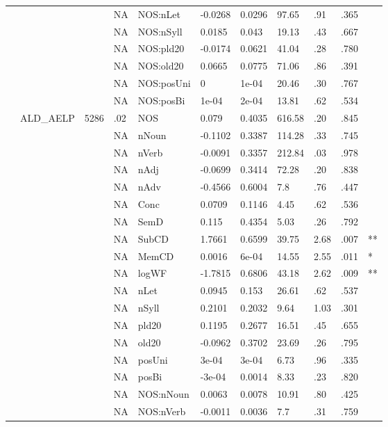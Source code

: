 \begin{table}[ht]
\begin{tabular}{lllllllllll}
   &  &  & NA & NOS:nLet & -0.0268 & 0.0296 & 97.65 & .91 & .365 &   \\ 
   &  &  & NA & NOS:nSyll & 0.0185 & 0.043 & 19.13 & .43 & .667 &   \\ 
   &  &  & NA & NOS:pld20 & -0.0174 & 0.0621 & 41.04 & .28 & .780 &   \\ 
   &  &  & NA & NOS:old20 & 0.0665 & 0.0775 & 71.06 & .86 & .391 &   \\ 
   &  &  & NA & NOS:posUni & 0 & 1e-04 & 20.46 & .30 & .767 &   \\ 
   &  &  & NA & NOS:posBi & 1e-04 & 2e-04 & 13.81 & .62 & .534 &   \\ 
   & ALD\_AELP & 5286 & .02 & NOS & 0.079 & 0.4035 & 616.58 & .20 & .845 &   \\ 
   &  &  & NA & nNoun & -0.1102 & 0.3387 & 114.28 & .33 & .745 &   \\ 
   &  &  & NA & nVerb & -0.0091 & 0.3357 & 212.84 & .03 & .978 &   \\ 
   &  &  & NA & nAdj & -0.0699 & 0.3414 & 72.28 & .20 & .838 &   \\ 
   &  &  & NA & nAdv & -0.4566 & 0.6004 & 7.8 & .76 & .447 &   \\ 
   &  &  & NA & Conc & 0.0709 & 0.1146 & 4.45 & .62 & .536 &   \\ 
   &  &  & NA & SemD & 0.115 & 0.4354 & 5.03 & .26 & .792 &   \\ 
   &  &  & NA & SubCD & 1.7661 & 0.6599 & 39.75 & 2.68 & .007 & ** \\ 
   &  &  & NA & MemCD & 0.0016 & 6e-04 & 14.55 & 2.55 & .011 & * \\ 
   &  &  & NA & logWF & -1.7815 & 0.6806 & 43.18 & 2.62 & .009 & ** \\ 
   &  &  & NA & nLet & 0.0945 & 0.153 & 26.61 & .62 & .537 &   \\ 
   &  &  & NA & nSyll & 0.2101 & 0.2032 & 9.64 & 1.03 & .301 &   \\ 
   &  &  & NA & pld20 & 0.1195 & 0.2677 & 16.51 & .45 & .655 &   \\ 
   &  &  & NA & old20 & -0.0962 & 0.3702 & 23.69 & .26 & .795 &   \\ 
   &  &  & NA & posUni & 3e-04 & 3e-04 & 6.73 & .96 & .335 &   \\ 
   &  &  & NA & posBi & -3e-04 & 0.0014 & 8.33 & .23 & .820 &   \\ 
   &  &  & NA & NOS:nNoun & 0.0063 & 0.0078 & 10.91 & .80 & .425 &   \\ 
   &  &  & NA & NOS:nVerb & -0.0011 & 0.0036 & 7.7 & .31 & .759 &   \\ 

\end{tabular}
\end{table}
